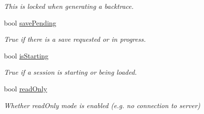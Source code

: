 \begin{DoxyCompactItemize}
\begin{DoxyCompactList}\small\item\em This is locked when generating a backtrace. \end{DoxyCompactList}\item 
\hypertarget{classGlobalSearch_1_1OptBase_a2e5ba27bde6be3257cc44b7a7bb87598}{}bool \hyperlink{classGlobalSearch_1_1OptBase_a2e5ba27bde6be3257cc44b7a7bb87598}{save\+Pending}\label{classGlobalSearch_1_1OptBase_a2e5ba27bde6be3257cc44b7a7bb87598}

\begin{DoxyCompactList}\small\item\em True if there is a save requested or in progress. \end{DoxyCompactList}\item 
\hypertarget{classGlobalSearch_1_1OptBase_a63828837cb869c94cb7309cbb7331f7c}{}bool \hyperlink{classGlobalSearch_1_1OptBase_a63828837cb869c94cb7309cbb7331f7c}{is\+Starting}\label{classGlobalSearch_1_1OptBase_a63828837cb869c94cb7309cbb7331f7c}

\begin{DoxyCompactList}\small\item\em True if a session is starting or being loaded. \end{DoxyCompactList}\item 
\hypertarget{classGlobalSearch_1_1OptBase_ac85d94d2e3b44f66461e470e04db3f0e}{}bool \hyperlink{classGlobalSearch_1_1OptBase_ac85d94d2e3b44f66461e470e04db3f0e}{read\+Only}\label{classGlobalSearch_1_1OptBase_ac85d94d2e3b44f66461e470e04db3f0e}

\begin{DoxyCompactList}\small\item\em Whether read\+Only mode is enabled (e.\+g. no connection to server) \end{DoxyCompactList}\end{DoxyCompactItemize}

